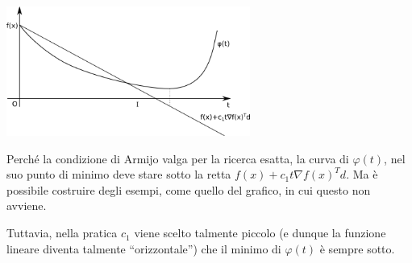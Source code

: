 \centerline{\includegraphics[width=0.60\textwidth]{imgs/ricerca-esatta-no-armijo.png}}

Perch\'e la condizione di Armijo valga per la ricerca esatta, la curva
di $\varphi(t)$, nel suo punto di minimo deve stare sotto la retta
$f(x) + c_1 t \nabla f(x)^{T}d$. Ma \`e possibile costruire degli
esempi, come quello del grafico, in cui questo non avviene.

Tuttavia, nella pratica $c_1$ viene scelto talmente piccolo (e dunque
la funzione lineare diventa talmente ``orizzontale'') che il minimo di
$\varphi(t)$ \`e sempre sotto.

